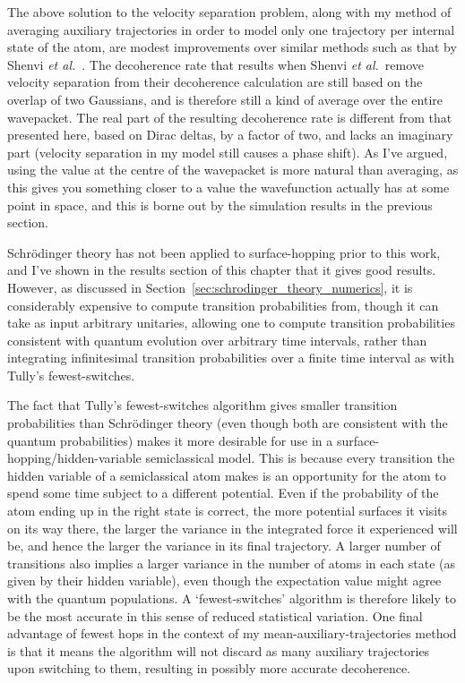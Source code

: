 The above solution to the velocity separation problem, along with my method of averaging auxiliary trajectories in order to model only one trajectory per internal state of the atom, are modest improvements over similar methods such as that by Shenvi \emph{et al.}~\cite{doi:10.1063/1.3575588}. The decoherence rate that results when Shenvi \emph{et al.}~remove velocity separation from their decoherence calculation are still based on the overlap of two Gaussians, and is therefore still a kind of average over the entire wavepacket. The real part of the resulting decoherence rate is different from that presented here, based on Dirac deltas, by a factor of two, and lacks an imaginary part (velocity separation in my model still causes a phase shift). As I've argued, using the value at the centre of the wavepacket is more natural than averaging, as this gives you something closer to a value the wavefunction actually has at some point in space, and this is borne out by the simulation results in the previous section.

Schr\"odinger theory has not been applied to surface-hopping prior to this work, and I've shown in the results section of this chapter that it gives good results. However, as discussed in Section~\ref{sec:schrodinger_theory_numerics}, it is considerably expensive to compute transition probabilities from, though it can take as input arbitrary unitaries, allowing one to compute transition probabilities consistent with quantum evolution over arbitrary time intervals, rather than integrating infinitesimal transition probabilities over a finite time interval as with Tully's fewest-switches. 

The fact that Tully's fewest-switches algorithm gives smaller transition probabilities than Schr\"odinger theory (even though both are consistent with the quantum probabilities) makes it more desirable for use in a surface-hopping/hidden-variable semiclassical model. This is because every transition the hidden variable of a semiclassical atom makes is an opportunity for the atom to spend some time subject to a different potential. Even if the probability of the atom ending up in the right state is correct, the more potential surfaces it visits on its way there, the larger the variance in the integrated force it experienced will be, and hence the larger the variance in its final trajectory. A larger number of transitions also implies a larger variance in the number of atoms in each state (as given by their hidden variable), even though the expectation value might agree with the quantum populations. A `fewest-switches' algorithm is therefore likely to be the most accurate in this sense of reduced statistical variation. One final advantage of fewest hops in the context of my mean-auxiliary-trajectories method is that it means the algorithm will not discard as many auxiliary trajectories upon switching to them, resulting in possibly more accurate decoherence.

